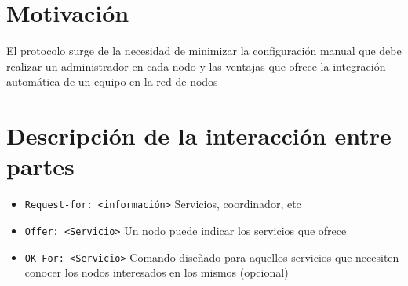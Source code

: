 \documentclass{article}
\title{\titulo}
\author{\autor}
\date{\today} %
\newcommand{\nombre}{MarcoPolo}
\begin{document}
\maketitle

\begin{abstract}
El protocolo \nombre{} permite el descubrimiento de máquinas ofreciendo una serie de servicios consumibles por el sistema distribuido, permitiendo publicar y solicitar nodos, obtener información del estado de nodos y una serie de funcionalidades de diagnóstico.
\end{abstract}

\section{Motivación}

El protocolo surge de la necesidad de minimizar la configuración manual que debe realizar un administrador en cada nodo y las ventajas que ofrece la integración automática de un equipo en la red de nodos

\section{Descripción de la interacción entre partes}

\begin{itemize}
  \item\texttt{Request-for: <información>} Servicios, coordinador, etc
  \item\texttt{Offer: <Servicio>} Un nodo puede indicar los servicios que ofrece
  \item\texttt{OK-For: <Servicio>} Comando diseñado para aquellos servicios que necesiten conocer los nodos interesados en los mismos (opcional) 
\end{itemize}





%


%

%
\end{document}
